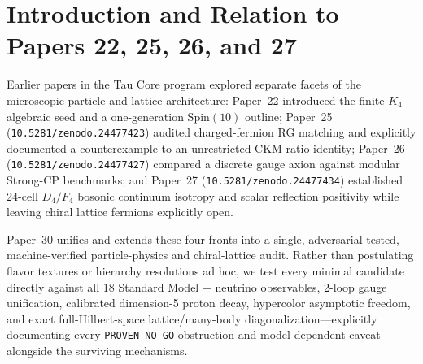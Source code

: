 \documentclass[11pt,a4paper]{article}
\begin{document}
\section{Introduction and Relation to Papers 22, 25, 26, and 27}
Earlier papers in the Tau Core program explored separate facets of the microscopic particle and lattice architecture: Paper~22 introduced the finite $K_4$ algebraic seed and a one-generation $\mathrm{Spin}(10)$ outline; Paper~25 (\texttt{10.5281/zenodo.24477423}) audited charged-fermion RG matching and explicitly documented a counterexample to an unrestricted CKM ratio identity; Paper~26 (\texttt{10.5281/zenodo.24477427}) compared a discrete gauge axion against modular Strong-CP benchmarks; and Paper~27 (\texttt{10.5281/zenodo.24477434}) established 24-cell $D_4/F_4$ bosonic continuum isotropy and scalar reflection positivity while leaving chiral lattice fermions explicitly open.

Paper~30 unifies and extends these four fronts into a single, adversarial-tested, machine-verified particle-physics and chiral-lattice audit. Rather than postulating flavor textures or hierarchy resolutions ad hoc, we test every minimal candidate directly against all 18 Standard Model + neutrino observables, 2-loop gauge unification, calibrated dimension-5 proton decay, hypercolor asymptotic freedom, and exact full-Hilbert-space lattice/many-body diagonalization---explicitly documenting every \texttt{PROVEN NO-GO} obstruction and model-dependent caveat alongside the surviving mechanisms.
\end{document}
